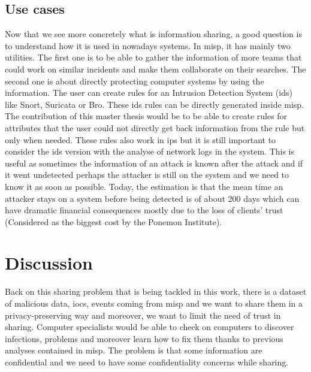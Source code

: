 \documentclass{eplmastersthesis}
\begin{document}
\subsection{Use cases}
Now that we see more concretely what is information sharing, a good question is to understand how it is used in nowadays systems. In \gls{misp}, it has mainly two utilities. The first one is to be able to gather the information of more teams that could work on similar incidents and make them collaborate on their searches.
The second one is about directly protecting computer systems by using the information. The user can create rules for an Intrusion Detection System (\gls{ids}) like Snort, Suricata or Bro. These \gls{ids} rules can be directly generated inside \gls{misp}. The contribution of this master thesis would be to be able to create rules for attributes that the user could not directly get back information from the rule but only when needed.
These rules also work in \gls{ips} but it is still important to consider the \gls{ids} version with the analyse of network logs in the system. This is useful as sometimes the information of an attack is known after the attack and if it went undetected perhaps the attacker is still on the system and we need to know it as soon as possible.
Today, the estimation is that the mean time an attacker stays on a system before being detected is of about 200 days which can have dramatic financial consequences mostly due to the loss of clients' trust (Considered as the biggest cost by the Ponemon Institute).\\

\section{Discussion}

Back on this sharing problem that is being tackled in this work, there is a dataset of malicious data, \glspl{ioc}, events coming from \gls{misp} and we want to share them in a privacy-preserving way and moreover, we want to limit the need of trust in sharing.
Computer specialists would be able to check on computers to discover infections, problems and moreover learn how to fix them thanks to previous analyses contained in \gls{misp}. The problem is that some information are confidential and we need to have some confidentiality concerns while sharing. \\
\end{document}
